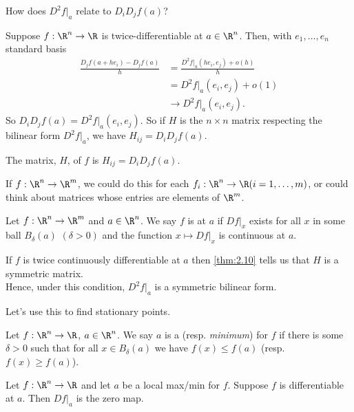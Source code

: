 \begin{question}
    How does $D^2f|_a$ relate to $D_i D_j f(a)$?
\end{question}

Suppose $f:\R^n\to\R$ is twice-differentiable at $a\in \R^n$.
Then, with $e_1,\dots ,e_n$ standard basis
\begin{align*}
    \frac{D_jf(a+he_i)-D_jf(a)}{h} &= \frac{D^2f|_a(he_i,e_j) + o(h)}{h}\\
    &= D^2f|_a(e_i,e_j) + o(1) \\
    &\to D^2f|_a(e_i,e_j).
\end{align*}
So $D_iD_jf(a) = D^2f|_a(e_i,e_j)$.
So if $H$ is the $n\times n$ matrix respecting the bilinear form $D^2f|_a$, we have $H_{ij} = D_iD_jf(a)$.

\begin{definition}[Hessian]
    The  matrix, $H$, of $f$ is $H_{ij} = D_iD_jf(a)$.
\end{definition}

If $f:\R^n\to\R^m$, we could do this for each $f_i: \R^n\to \R (i=1,\dots ,m)$, or could think about matrices whose entries are elements of $\R^m$.

\begin{definition}
    Let $f:\R^n \to \R^m$ and $a \in \R^n$.
    We say $f$ is  at $a$ if $Df|_x$ exists for all $x$ in some ball $B_\delta(a)$ $(\delta > 0)$ and the function $x\mapsto Df|_x$ is continuous at $a$.
\end{definition}

\begin{remark}
    If $f$ is twice continuously differentiable at $a$ then \cref{thm:2.10} tells us that $H$ is a symmetric matrix. \\
    Hence, under this condition, $D^2f|_a$ is a symmetric bilinear form.
\end{remark}

Let's use this to find stationary points.
\begin{definition}
    Let $f:\R^n \to \R$, $a \in \R^n$.
    We say $a$ is a  (resp. \emph{minimum}) for $f$ if there is some $\delta>0$ such that for all $x\in B_\delta(a)$ we have $f(x)\leq f(a)$ (resp. $f(x) \ge f(a)$).
\end{definition}

\begin{proposition} \label{prp:2.1q}
    Let $f:\R^n \to \R$ and let $a$ be a local max/min for $f$.
    Suppose $f$ is differentiable at $a$.
    Then  $Df|_a$ is the zero map.
\end{proposition}

